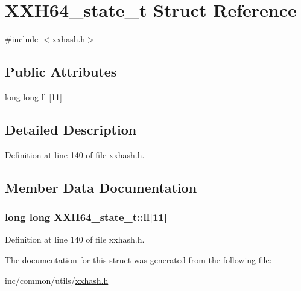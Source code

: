 \hypertarget{struct_x_x_h64__state__t}{}\section{X\+X\+H64\+\_\+state\+\_\+t Struct Reference}
\label{struct_x_x_h64__state__t}


{\ttfamily \#include $<$xxhash.\+h$>$}

\subsection*{Public Attributes}
\begin{DoxyCompactItemize}
\item 
long long \hyperlink{struct_x_x_h64__state__t_a9733d20d40ce914eabba76b954920ff9}{ll} \mbox{[}11\mbox{]}
\end{DoxyCompactItemize}


\subsection{Detailed Description}


Definition at line 140 of file xxhash.\+h.



\subsection{Member Data Documentation}
\hypertarget{struct_x_x_h64__state__t_a9733d20d40ce914eabba76b954920ff9}{}
\subsubsection[{ll}]{\setlength{\rightskip}{0pt plus 5cm}long long X\+X\+H64\+\_\+state\+\_\+t\+::ll\mbox{[}11\mbox{]}}\label{struct_x_x_h64__state__t_a9733d20d40ce914eabba76b954920ff9}


Definition at line 140 of file xxhash.\+h.



The documentation for this struct was generated from the following file\+:\begin{DoxyCompactItemize}
\item 
inc/common/utils/\hyperlink{xxhash_8h}{xxhash.\+h}\end{DoxyCompactItemize}
